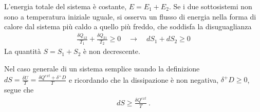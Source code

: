 \documentclass[letterpaper,10pt,italian]{jupyterBook}
\begin{document}
\sphinxAtStartPar
L’energia totale del sistema è costante, \(E = E_1 + E_2\). Se i due sottosistemi non sono a temperatura iniziale uguale, si osserva un flusso di energia nella forma di calore dal sistema più caldo a quello più freddo, che soddisfa la disuguaglianza
\begin{equation*}
\begin{split}
 \frac{\delta Q_{12}}{T_1} + \frac{\delta Q_{21}}{T_2} \ge 0 \quad \rightarrow \quad
 d S_1 + d S_2 \ge 0
\end{split}
\end{equation*}
\sphinxAtStartPar
La quantità \(S = S_1 + S_2\) è non decrescente.

\sphinxAtStartPar
Nel caso generale di un sistema semplice usando la definizione \(dS = \frac{\delta U}{T} = \frac{\delta Q^{ext} + \delta^+ D}{T}\) e ricordando che la dissipazione è non negativa, \(\delta^+ D \ge 0\), segue che
\begin{equation*}
\begin{split}d S \ge \frac{\delta Q^{ext}}{T} \ .\end{split}
\end{equation*}
\end{document}
